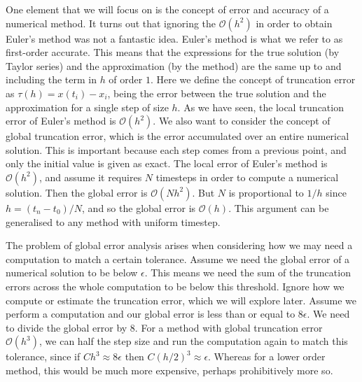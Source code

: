 \documentclass{report}
\theoremstyle{exampstyle} \newtheorem{example}[theorem]{Example}
\theoremstyle{exampstyle} \newtheorem{remark}[theorem]{Remark}
\theoremstyle{exampstyle} \newtheorem{definition}[theorem]{Definition}
\theoremstyle{exampstyle} \newtheorem{lemma}[theorem]{Lemma}
\begin{document}
One element that we will focus on is the concept of error and accuracy of a numerical method.
It turns out that ignoring the $\mathcal{O}(h^2)$ in order to obtain Euler's method was not a fantastic idea.
Euler's method is what we refer to as first-order accurate.
This means that the expressions for the true solution (by Taylor series) and the approximation (by the method) are the same up to and including the term in $h$ of order $1$.
Here we define the concept of truncation error as $\tau(h) = x(t_i) - x_i$, being the error between the true solution and the approximation for a single step of size $h$.
As we have seen, the local truncation error of Euler's method is $\mathcal{O}(h^2)$.
We also want to consider the concept of global truncation error, which is the error accumulated over an entire numerical solution.
This is important because each step comes from a previous point, and only the initial value is given as exact. %
The local error of Euler's method is $\mathcal{O}(h^2)$, and assume it requires $N$ timesteps in order to compute a numerical solution.
Then the global error is $\mathcal{O}(Nh^2)$. But $N$ is proportional to $1/h$ since $h = (t_n - t_0)/N$, and so the global error is $\mathcal{O}(h)$.
This argument can be generalised to any method with uniform timestep.

The problem of global error analysis arises when considering how we may need a computation to match a certain tolerance.
Assume we need the global error of a numerical solution to be below $\epsilon$.
This means we need the sum of the truncation errors across the whole computation to be below this threshold.
Ignore how we compute or estimate the truncation error, which we will explore later.
Assume we perform a computation and our global error is less than or equal to $8 \epsilon$.
We need to divide the global error by $8$. For a method with global truncation error $\mathcal{O}(h^3)$,
we can half the step size and run the computation again to match this tolerance, since if $C h^3 \approx 8 \epsilon$ then $C (h/2)^3 \approx \epsilon$.
Whereas for a lower order method, this would be much more expensive, perhaps prohibitively more so.
\end{document}
